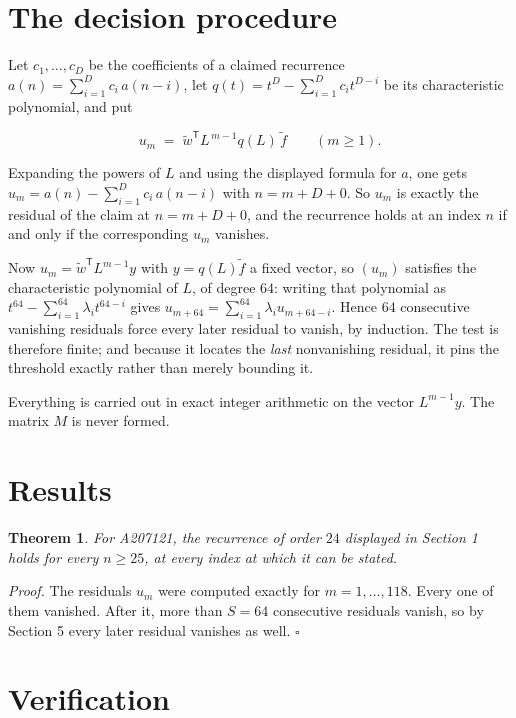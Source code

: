 \documentclass[11pt]{article}
\newtheorem{theorem}{Theorem}
\theoremstyle{definition}
\begin{document}
\section{The decision procedure}

Let $c_1,\dots,c_D$ be the coefficients of a claimed recurrence $a(n) = \sum_{i=1}^{D} c_i\,a(n-i)$, let $q(t) = t^{D} - \sum_{i=1}^{D} c_i t^{D-i}$ be its characteristic polynomial, and put

\[u_m \;=\; \tilde w^{\mathsf T} L^{\,m-1} q(L)\,\tilde f \qquad (m \ge 1).\]

Expanding the powers of $L$ and using the displayed formula for $a$, one gets $u_m = a(n) - \sum_{i=1}^{D} c_i\,a(n-i)$ with $n = m + D + 0$. So $u_m$ is exactly the residual of the claim at $n = m + D + 0$, and the recurrence holds at an index $n$ if and only if the corresponding $u_m$ vanishes.

Now $u_m = \tilde w^{\mathsf T} L^{m-1} y$ with $y = q(L)\tilde f$ a fixed vector, so $(u_m)$ satisfies the characteristic polynomial of $L$, of degree $64$: writing that polynomial as $t^{64} - \sum_{i=1}^{64} \lambda_i t^{64-i}$ gives $u_{m+64} = \sum_{i=1}^{64} \lambda_i u_{m+64-i}$. Hence $64$ consecutive vanishing residuals force every later residual to vanish, by induction. The test is therefore finite; and because it locates the {\itshape last} nonvanishing residual, it pins the threshold exactly rather than merely bounding it.

Everything is carried out in exact integer arithmetic on the vector $L^{m-1}y$. The matrix $M$ is never formed.

\section{Results}

\begin{theorem} For A207121, the recurrence of order $24$ displayed in Section 1 holds for every $n \ge 25$, at every index at which it can be stated.\end{theorem}

{\itshape Proof.} The residuals $u_m$ were computed exactly for $m = 1,\dots,118$. Every one of them vanished. After it, more than $S = 64$ consecutive residuals vanish, so by Section 5 every later residual vanishes as well. $\square$

\section{Verification}
\end{document}
